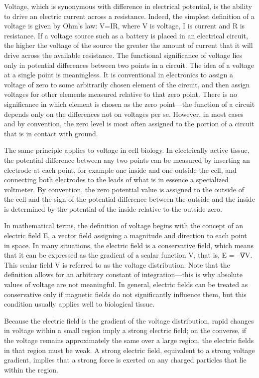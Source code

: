 \documentclass[]{book}
\begin{document}
Voltage, which is synonymous with difference in electrical potential, is the ability to drive an electric current across a resistance. Indeed, the simplest definition of a voltage is given by Ohm's law: V=IR, where V is voltage, I is current and R is resistance. If a voltage source such as a battery is placed in an electrical circuit, the higher the voltage of the source the greater the amount of current that it will drive across the available resistance. The functional significance of voltage lies only in potential differences between two points in a circuit. The idea of a voltage at a single point is meaningless. It is conventional in electronics to assign a voltage of zero to some arbitrarily chosen element of the circuit, and then assign voltages for other elements measured relative to that zero point. There is no significance in which element is chosen as the zero point---the function of a circuit depends only on the differences not on voltages per se. However, in most cases and by convention, the zero level is most often assigned to the portion of a circuit that is in contact with ground.

The same principle applies to voltage in cell biology. In electrically active tissue, the potential difference between any two points can be measured by inserting an electrode at each point, for example one inside and one outside the cell, and connecting both electrodes to the leads of what is in essence a specialized voltmeter. By convention, the zero potential value is assigned to the outside of the cell and the sign of the potential difference between the outside and the inside is determined by the potential of the inside relative to the outside zero.

In mathematical terms, the definition of voltage begins with the concept of an electric field E, a vector field assigning a magnitude and direction to each point in space. In many situations, the electric field is a conservative field, which means that it can be expressed as the gradient of a scalar function V, that is, E = --∇V. This scalar field V is referred to as the voltage distribution. Note that the definition allows for an arbitrary constant of integration---this is why absolute values of voltage are not meaningful. In general, electric fields can be treated as conservative only if magnetic fields do not significantly influence them, but this condition usually applies well to biological tissue.

Because the electric field is the gradient of the voltage distribution, rapid changes in voltage within a small region imply a strong electric field; on the converse, if the voltage remains approximately the same over a large region, the electric fields in that region must be weak. A strong electric field, equivalent to a strong voltage gradient, implies that a strong force is exerted on any charged particles that lie within the region.
\end{document}
